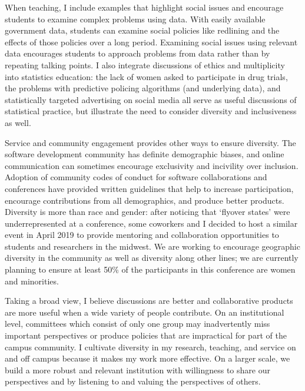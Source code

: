\documentclass[12pt, letterpaper, sans]{moderncv}
\begin{document}
When teaching, I include examples that highlight social issues and encourage students to examine complex problems using data. With easily available government data, students can examine social policies like redlining and the effects of those policies over a long period. Examining social issues using relevant data encourages students to approach problems from data rather than by repeating talking points. I also integrate discussions of ethics and multiplicity into statistics education: the lack of women asked to participate in drug trials, the problems with predictive policing algorithms (and underlying data), and statistically targeted advertising on social media all serve as useful discussions of statistical practice, but illustrate the need to consider diversity and inclusiveness as well. 

Service and community engagement provides other ways to ensure diversity. The software development community has definite demographic biases, and online communication can sometimes encourage exclusivity and incivility over inclusion. Adoption of community codes of conduct for software collaborations and conferences have provided written guidelines that help to increase participation, encourage contributions from all demographics, and produce better products. Diversity is more than race and gender: after noticing that `flyover states' were underrepresented at a conference, some coworkers and I decided to host a similar event in April 2019 to provide mentoring and collaboration opportunities to students and researchers in the midwest. We are working to encourage geographic diversity in the community as well as diversity along other lines; we are currently planning to ensure at least 50\% of the participants in this conference are women and minorities. 

Taking a broad view, I believe discussions are better and collaborative products are more useful when a wide variety of people contribute. On an institutional level, committees which consist of only one group may inadvertently miss important perspectives or produce policies that are impractical for part of the campus community. I cultivate diversity in my research, teaching, and service on and off campus because it makes my work more effective. On a larger scale, we build a more robust and relevant institution with willingness to share our perspectives and by listening to and valuing the perspectives of others. 
\end{document}
